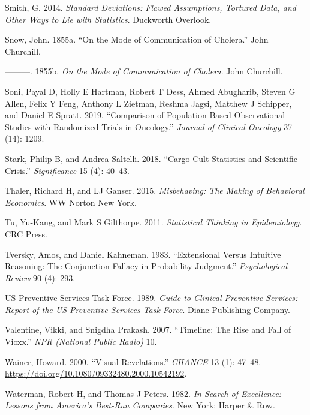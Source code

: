 \documentclass[
  10ptls,
  b5paper]{book}
\newlength{\cslhangindent}
\newenvironment{CSLReferences}[2] %
 {\begin{list}{}{%
  \setlength{\itemindent}{0pt}
  \setlength{\leftmargin}{0pt}
  \setlength{\parsep}{0pt}
  \ifodd #1
   \setlength{\leftmargin}{\cslhangindent}
   \setlength{\itemindent}{-1\cslhangindent}
  \fi
  \setlength{\itemsep}{#2\baselineskip}}}
 {\end{list}}
\begin{document}
\begin{CSLReferences}{1}{0}
Smith, G. 2014. \emph{Standard Deviations: Flawed Assumptions, Tortured Data, and Other Ways to Lie with Statistics}. Duckworth Overlook.

Snow, John. 1855a. {``On the Mode of Communication of Cholera.''} John Churchill.

---------. 1855b. \emph{On the Mode of Communication of Cholera}. John Churchill.

Soni, Payal D, Holly E Hartman, Robert T Dess, Ahmed Abugharib, Steven G Allen, Felix Y Feng, Anthony L Zietman, Reshma Jagsi, Matthew J Schipper, and Daniel E Spratt. 2019. {``Comparison of Population-Based Observational Studies with Randomized Trials in Oncology.''} \emph{Journal of Clinical Oncology} 37 (14): 1209.

Stark, Philip B, and Andrea Saltelli. 2018. {``Cargo-Cult Statistics and Scientific Crisis.''} \emph{Significance} 15 (4): 40--43.

Thaler, Richard H, and LJ Ganser. 2015. \emph{Misbehaving: The Making of Behavioral Economics}. WW Norton New York.

Tu, Yu-Kang, and Mark S Gilthorpe. 2011. \emph{Statistical Thinking in Epidemiology}. CRC Press.

Tversky, Amos, and Daniel Kahneman. 1983. {``Extensional Versus Intuitive Reasoning: The Conjunction Fallacy in Probability Judgment.''} \emph{Psychological Review} 90 (4): 293.

US Preventive Services Task Force. 1989. \emph{Guide to Clinical Preventive Services: Report of the US Preventive Services Task Force}. Diane Publishing Company.

Valentine, Vikki, and Snigdha Prakash. 2007. {``Timeline: The Rise and Fall of Vioxx.''} \emph{NPR (National Public Radio)} 10.

Wainer, Howard. 2000. {``Visual Revelations.''} \emph{CHANCE} 13 (1): 47--48. \url{https://doi.org/10.1080/09332480.2000.10542192}.

Waterman, Robert H, and Thomas J Peters. 1982. \emph{In Search of Excellence: Lessons from America's Best-Run Companies}. New York: Harper \& Row.


\end{CSLReferences}
\end{document}
